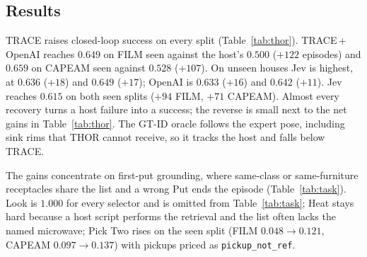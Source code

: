 \documentclass[conference]{IEEEtran}
\begin{document}
\subsection{Results}
TRACE raises closed-loop success on every split (Table~\ref{tab:thor}).
TRACE\,+\,OpenAI reaches $0.649$ on FILM seen against the host's $0.500$ ($+122$ episodes) and $0.659$ on CAPEAM seen against $0.528$ ($+107$). %
On unseen houses Jev is highest, at $0.636$ ($+18$) and $0.649$ ($+17$); OpenAI is $0.633$ ($+16$) and $0.642$ ($+11$). %
Jev reaches $0.615$ on both seen splits ($+94$ FILM, $+71$ CAPEAM). %
Almost every recovery turns a host failure into a success; the reverse is small next to the net gains in Table~\ref{tab:thor}. %
The GT-ID oracle follows the expert pose, including sink rims that THOR cannot receive, so it tracks the host and falls below TRACE.

The gains concentrate on first-put grounding, where same-class or same-furniture receptacles share the list and a wrong Put ends the episode (Table~\ref{tab:task}).
Look is $1.000$ for every selector and is omitted from Table~\ref{tab:task}; Heat stays hard because a host script performs the retrieval and the list often lacks the named microwave; Pick Two rises on the seen split (FILM $0.048{\to}0.121$, CAPEAM $0.097{\to}0.137$) with \Diff{} pickups priced as \texttt{pickup\_not\_ref}. %
\end{document}
